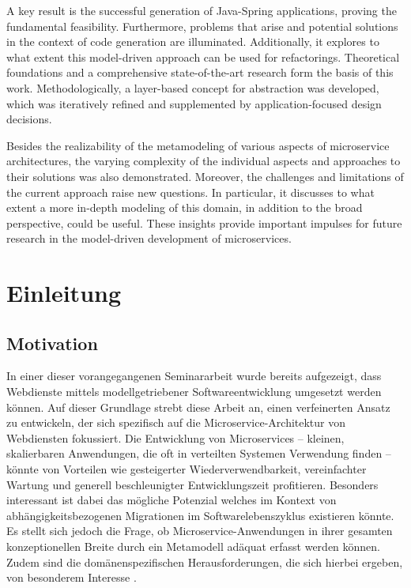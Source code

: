 A key result is the successful generation of Java-Spring applications, proving the fundamental feasibility. Furthermore, problems that arise and potential solutions in the context of code generation are illuminated. Additionally, it explores to what extent this model-driven approach can be used for refactorings. Theoretical foundations and a comprehensive state-of-the-art research form the basis of this work. Methodologically, a layer-based concept for abstraction was developed, which was iteratively refined and supplemented by application-focused design decisions.

Besides the realizability of the metamodeling of various aspects of microservice architectures, the varying complexity of the individual aspects and approaches to their solutions was also demonstrated. Moreover, the challenges and limitations of the current approach raise new questions. In particular, it discusses to what extent a more in-depth modeling of this domain, in addition to the broad perspective, could be useful. These insights provide important impulses for future research in the model-driven development of microservices.

\newpage

\chapter{Einleitung}

\section{Motivation}

In einer dieser vorangegangenen Seminararbeit wurde bereits aufgezeigt, dass Webdienste mittels modellgetriebener Softwareentwicklung umgesetzt werden können. Auf dieser Grundlage strebt diese Arbeit an, einen verfeinerten Ansatz zu entwickeln, der sich spezifisch auf die Microservice-Architektur von Webdiensten fokussiert. Die Entwicklung von Microservices – kleinen, skalierbaren Anwendungen, die oft in verteilten Systemen Verwendung finden – könnte von Vorteilen wie gesteigerter Wiederverwendbarkeit, vereinfachter Wartung und generell beschleunigter Entwicklungszeit profitieren. Besonders interessant ist dabei das mögliche Potenzial welches im Kontext von abhängigkeitsbezogenen Migrationen im Softwarelebenszyklus existieren könnte. Es stellt sich jedoch die Frage, ob Microservice-Anwendungen in ihrer gesamten konzeptionellen Breite durch ein Metamodell adäquat erfasst werden können. Zudem sind die domänenspezifischen Herausforderungen, die sich hierbei ergeben, von besonderem Interesse \cite{loeffler}.


